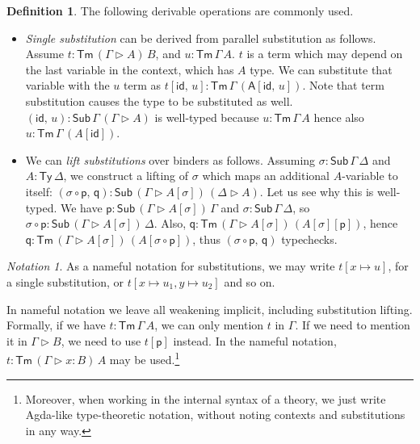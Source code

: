 \documentclass[12pt,a4paper,twoside,openany]{book}
\theoremstyle{remark}
\newtheorem{notation}{Notation}
\theoremstyle{definition}
\newtheorem{mydefinition}{Definition}
\theoremstyle{theorem}
\newcommand{\id}{\mathsf{id}}
\newcommand{\Sub}{\mathsf{Sub}}
\newcommand{\Tm}{\mathsf{Tm}}
\newcommand{\Ty}{\mathsf{Ty}}
\newcommand{\ext}{\triangleright}
\newcommand{\p}{\mathsf{p}}
\newcommand{\q}{\mathsf{q}}
\newcommand{\A}{\mathsf{A}}
\begin{document}
\begin{mydefinition} The following derivable operations are commonly used.
\label{def:cwfops}
  \begin{itemize}
    \item \emph{Single substitution} can be derived from parallel substitution
      as follows. Assume $t : \Tm\,(\Gamma\ext A)\,B$, and $u :
      \Tm\,\Gamma\,A$. $t$ is a term which may depend on the last variable in
      the context, which has $A$ type. We can substitute that variable with the
      $u$ term as $t[\id,\,u] : \Tm\,\Gamma\,(\A[\id,\,u])$. Note that term
      substitution causes the type to be substituted as well. $(\id,\,u) :
      \Sub\,\Gamma\,(\Gamma\ext A)$ is well-typed because $u : \Tm\,\Gamma\,A$
      hence also $u : \Tm\,\Gamma\,(A[\id])$.

    \item We can \emph{lift substitutions} over binders as follows. Assuming
      $\sigma : \Sub\,\Gamma\,\Delta$ and $A : \Ty\,\Delta$, we construct a
      lifting of $\sigma$ which maps an additional $A$-variable to itself:
      $(\sigma\circ\p,\,\q) : \Sub\,(\Gamma\ext A[\sigma])\,(\Delta \ext A)$.
      Let us see why this is well-typed. We have $\p : \Sub\,(\Gamma\ext
      A[\sigma])\,\Gamma$ and $\sigma : \Sub\,\Gamma\,\Delta$, so $\sigma \circ
      \p : \Sub\,(\Gamma\ext A[\sigma])\,\Delta$. Also, $\q : \Tm\,(\Gamma\ext
      A[\sigma])\,(A[\sigma][\p])$, hence $\q : \Tm\,(\Gamma\ext
      A[\sigma])\,(A[\sigma \circ \p])$, thus $(\sigma\circ \p,\,\q)$
      typechecks.
  \end{itemize}
\end{mydefinition}

\begin{notation}

As a nameful notation for substitutions, we may write $t[x \mapsto u]$, for
a single substitution, or $t[x \mapsto u_1, y \mapsto u_2]$ and so on.

In nameful notation we leave all weakening implicit, including substitution
lifting. Formally, if we have $t : \Tm\,\Gamma\,A$, we can only mention $t$ in
$\Gamma$. If we need to mention it in $\Gamma \ext B$, we need to use $t[\p]$
instead. In the nameful notation, $t : \Tm\,(\Gamma\ext x : B)\,A$ may be
used.\footnote{Moreover, when working in the internal syntax of a theory, we
just write Agda-like type-theoretic notation, without noting contexts and
substitutions in any way.}
\end{notation}
\end{document}
